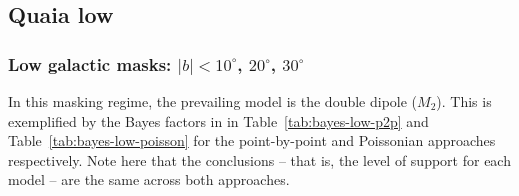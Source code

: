 \documentclass[fleqn,usenatbib]{mnras}
\begin{document}
    \subsection{Quaia low}

    \subsubsection{Low galactic masks: $|b| < 10^\circ$, $20^\circ$, $30^\circ$}
        \label{subs:low-gal-masks-low}
        In this masking regime, the prevailing model is the double dipole ($M_2$).
        This is exemplified by the Bayes factors in in Table~\ref{tab:bayes-low-p2p} and Table~\ref{tab:bayes-low-poisson} for the point-by-point and Poissonian approaches respectively. 
        Note here that the conclusions -- that is, the level of support for each model -- are the same across both approaches.
        
\end{document}
